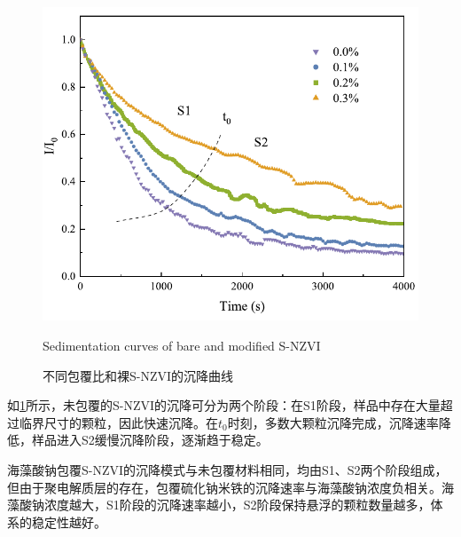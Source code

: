 \begin{figure}[h]
    \centering
    \includegraphics[scale=0.65]{figs/fig1.pdf}
    \caption{不同包覆比和裸S-NZVI的沉降曲线}{Sedimentation curves of bare and modified S-NZVI}\label{fig01}
\end{figure}

如\cref{fig01}所示，未包覆的S-NZVI的沉降可分为两个阶段：在S1阶段，样品中存在大量超过临界尺寸的颗粒，因此快速沉降。在$t_0$时刻，多数大颗粒沉降完成，沉降速率降低，样品进入S2缓慢沉降阶段，逐渐趋于稳定。

海藻酸钠包覆S-NZVI的沉降模式与未包覆材料相同，均由S1、S2两个阶段组成，但由于聚电解质层的存在，包覆硫化钠米铁的沉降速率与海藻酸钠浓度负相关。海藻酸钠浓度越大，S1阶段的沉降速率越小，S2阶段保持悬浮的颗粒数量越多，体系的稳定性越好。

